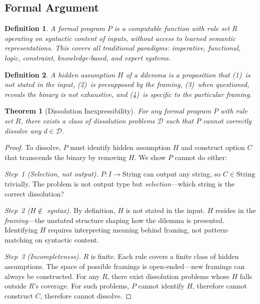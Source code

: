 \documentclass[11pt,a4paper]{article}
\newtheorem{theorem}{Theorem}
\newtheorem{definition}{Definition}
\begin{document}
\subsection{Formal Argument}

\begin{definition}
A \emph{formal program} $P$ is a computable function with rule set $R$ operating on syntactic content of inputs, without access to learned semantic representations. This covers all traditional paradigms: imperative, functional, logic, constraint, knowledge-based, and expert systems.
\end{definition}

\begin{definition}
A \emph{hidden assumption} $H$ of a dilemma is a proposition that (1)~is not stated in the input, (2)~is presupposed by the framing, (3)~when questioned, reveals the binary is not exhaustive, and (4)~is specific to the particular framing.
\end{definition}

\begin{theorem}[Dissolution Inexpressibility]
For any formal program $P$ with rule set $R$, there exists a class of dissolution problems $\mathcal{D}$ such that $P$ cannot correctly dissolve any $d \in \mathcal{D}$.
\end{theorem}

\begin{proof}
To dissolve, $P$ must identify hidden assumption $H$ and construct option $C$ that transcends the binary by removing $H$. We show $P$ cannot do either:

\emph{Step~1 (Selection, not output).} $P: I \to \mathrm{String}$ can output any string, so $C \in \mathrm{String}$ trivially. The problem is not output type but \emph{selection}---which string is the correct dissolution?

\emph{Step~2 ($H \notin$ syntax).} By definition, $H$ is not stated in the input. $H$ resides in the \emph{framing}---the unstated structure shaping how the dilemma is presented. Identifying $H$ requires interpreting meaning behind framing, not pattern-matching on syntactic content.

\emph{Step~3 (Incompleteness).} $R$ is finite. Each rule covers a finite class of hidden assumptions. The space of possible framings is open-ended---new framings can always be constructed. For any $R$, there exist dissolution problems whose $H$ falls outside $R$'s coverage. For such problems, $P$ cannot identify $H$, therefore cannot construct $C$, therefore cannot dissolve.
\end{proof}
\end{document}
